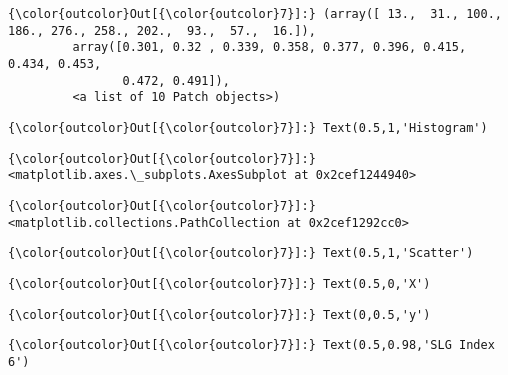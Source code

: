 \documentclass[11pt]{article}
\begin{document}
\begin{Verbatim}[commandchars=\\\{\}]
{\color{outcolor}Out[{\color{outcolor}7}]:} (array([ 13.,  31., 100., 186., 276., 258., 202.,  93.,  57.,  16.]),
         array([0.301, 0.32 , 0.339, 0.358, 0.377, 0.396, 0.415, 0.434, 0.453,
                0.472, 0.491]),
         <a list of 10 Patch objects>)
\end{Verbatim}
            
\begin{Verbatim}[commandchars=\\\{\}]
{\color{outcolor}Out[{\color{outcolor}7}]:} Text(0.5,1,'Histogram')
\end{Verbatim}
            
\begin{Verbatim}[commandchars=\\\{\}]
{\color{outcolor}Out[{\color{outcolor}7}]:} <matplotlib.axes.\_subplots.AxesSubplot at 0x2cef1244940>
\end{Verbatim}
            
\begin{Verbatim}[commandchars=\\\{\}]
{\color{outcolor}Out[{\color{outcolor}7}]:} <matplotlib.collections.PathCollection at 0x2cef1292cc0>
\end{Verbatim}
            
\begin{Verbatim}[commandchars=\\\{\}]
{\color{outcolor}Out[{\color{outcolor}7}]:} Text(0.5,1,'Scatter')
\end{Verbatim}
            
\begin{Verbatim}[commandchars=\\\{\}]
{\color{outcolor}Out[{\color{outcolor}7}]:} Text(0.5,0,'X')
\end{Verbatim}
            
\begin{Verbatim}[commandchars=\\\{\}]
{\color{outcolor}Out[{\color{outcolor}7}]:} Text(0,0.5,'y')
\end{Verbatim}
            
\begin{Verbatim}[commandchars=\\\{\}]
{\color{outcolor}Out[{\color{outcolor}7}]:} Text(0.5,0.98,'SLG Index 6')
\end{Verbatim}
            
\end{document}
